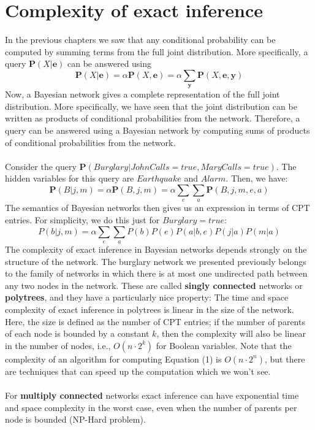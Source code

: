 \section{Complexity of exact inference}
In the previous chapters we saw that any conditional probability can be computed by summing terms from the full joint distribution.  More specifically, a query $\textbf{P}(X | \textbf{e})$ can be answered using
\[\textbf{P}(X | \textbf{e}) = \alpha \textbf{P}(X, \textbf{e}) = \alpha \sum_{\textbf{y}}\textbf{P}(X, \textbf{e}, \textbf{y})\]
Now, a Bayesian network gives a complete representation of the full joint distribution. More specifically, we have seen that the joint distribution can be written as products of conditional probabilities from the network. Therefore, a
query can be answered using a Bayesian network by computing sums of products of conditional probabilities from the network.\\\\
Consider the query $\textbf{P}(Burglary | JohnCalls = true, MaryCalls = true)$. The hidden variables for this query are $Earthquake$ and $Alarm$. Then, we have:
\[\textbf{P}(B | j, m) = \alpha \textbf{P}(B, j, m) = \alpha \sum_e \sum_a \textbf{P}(B, j, m, e, a)\]
The semantics of Bayesian networks then gives us an expression in terms of CPT entries. For simplicity, we do this just for $Burglary = true$:
\begin{equation}
    P(b | j, m) = \alpha \sum_e \sum_a P(b)P(e)P(a|b, e)P(j|a)P(m|a)
\end{equation}
The complexity of exact inference in Bayesian networks depends strongly on the structure of the network. The burglary network we presented previously belongs to the family of networks in which there is at most one undirected path between any two nodes in the network. These are called \textbf{singly connected} networks or \textbf{polytrees}, and they have a particularly nice property: The time and space complexity of exact inference in polytrees is linear in the size of the network. Here, the size is defined as the number of CPT entries; if the number of parents of each node is bounded by a constant $k$, then the complexity will also be linear in the number of nodes, i.e., $O(n \cdot 2^k)$ for Boolean variables. Note that the complexity of an algorithm for computing Equation (1) is $O(n \cdot 2^n)$, but there are techniques that can speed up the computation which we won't see.
\\\\
For \textbf{multiply connected} networks exact inference can have exponential time and space complexity in the worst case, even when the number of parents per node is bounded (NP-Hard problem).


